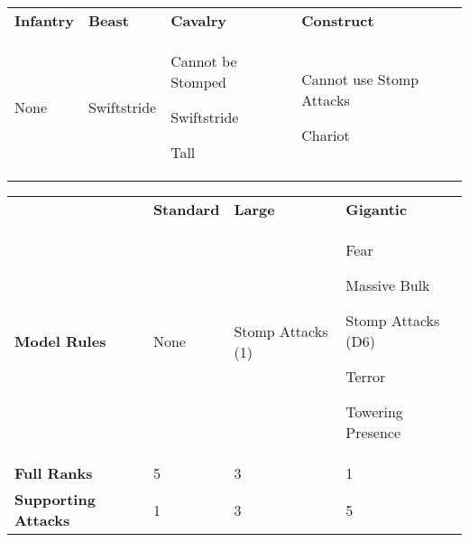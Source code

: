 \vspace*{-5pt}

\hspace*{\fill}\begin{tabular}[t]{M{1.2cm} M{1.5cm} M{1.5cm} M{2cm}}
\hline
  \textbf{Infantry} &
  \textbf{Beast} &
  \textbf{Cavalry} &
  \textbf{Construct} \\
   None &
  Swiftstride &
  Cannot be Stomped\par
  Swiftstride\par
  Tall &
  Cannot use Stomp Attacks\par
  Chariot\\
    \hline
\end{tabular}\hfill{\alternaterowcolors\begin{tabular}[t]{M{1.9cm} M{1.6cm} M{2.2cm} M{2.3cm}}
  \hline
  &%
  \textbf{Standard} &%
  \textbf{Large} &%
  \textbf{Gigantic} \\
   \textbf{Model Rules} &%
   None &%
  Stomp Attacks (1)&
  Fear\par
  Massive Bulk\par
  Stomp Attacks (D6)\par
  Terror\par
  Towering Presence\\
  \textbf{Full Ranks}&%
  5 &%
  3 &%
  1 \\
  \textbf{Supporting Attacks}&%
  1&%
  3&%
  5\\
  \hline
\end{tabular}}\hspace*{\fill}

\vspace*{-45pt}

